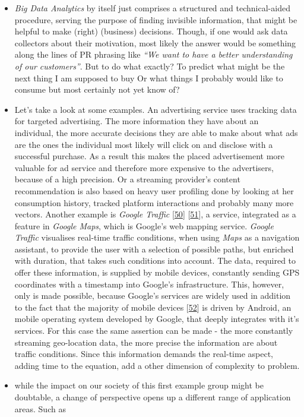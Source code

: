 \documentclass[12pt,english,a4paper,titlepage,cleardoublepage=empty,dottedtoc]{report}
\begin{document}
\begin{itemize}
\item
  \emph{Big Data Analytics} by itself just comprises a structured and
  technical-aided procedure, serving the purpose of finding invisible
  information, that might be helpful to make (right) (business)
  decisions. Though, if one would ask data collectors about their
  motivation, most likely the answer would be something along the lines
  of PR phrasing like \emph{``We want to have a better understanding of
  our customers''}. But to do what exactly? To predict what might be the
  next thing I am supposed to buy Or what things I probably would like
  to consume but most certainly not yet know of?
\item
  Let's take a look at some examples. An advertising service uses
  tracking data for targeted advertising. The more information they have
  about an individual, the more accurate decisions they are able to make
  about what ads are the ones the individual most likely will click on
  and disclose with a successful purchase. As a result this makes the
  placed advertisement more valuable for ad service and therefore more
  expensive to the advertisers, because of a high precision. Or a
  streaming provider's content recommendation is also based on heavy
  user profiling done by looking at her consumption history, tracked
  platform interactions and probably many more vectors. Another example
  is \emph{Google Traffic}
  {[}\protect\hyperlink{ref-web_2007_introducing-google-traffic}{50}{]}
  {[}\protect\hyperlink{ref-web_2016_wikipedia_google-traffic}{51}{]}, a
  service, integrated as a feature in \emph{Google Maps}, which is
  Google's web mapping service. \emph{Google Traffic} visualises
  real-time traffic conditions, when using \emph{Maps} as a navigation
  assistant, to provide the user with a selection of possible paths, but
  enriched with duration, that takes such conditions into account. The
  data, required to offer these information, is supplied by mobile
  devices, constantly sending GPS coordinates with a timestamp into
  Google's infrastructure. This, however, only is made possible, because
  Google's services are widely used in addition to the fact that the
  majority of mobile devices
  {[}\protect\hyperlink{ref-graphic_2016_global-mobile-os-market-share}{52}{]}
  is driven by Android, an mobile operating system developed by Google,
  that deeply integrates with it's services. For this case the same
  assertion can be made - the more constantly streaming geo-location
  data, the more precise the information are about traffic conditions.
  Since this information demands the real-time aspect, adding time to
  the equation, add a other dimension of complexity to problem.
\item
  while the impact on our society of this first example group might be
  doubtable, a change of perspective opens up a different range of
  application areas. Such as


\end{itemize}
\end{document}
